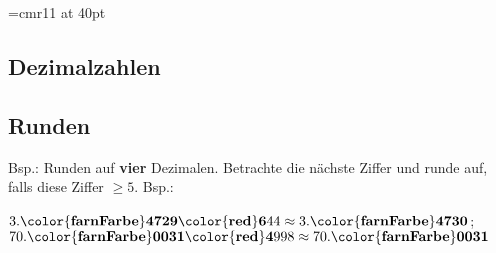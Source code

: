 \font\myfont=cmr11 at 40pt


\headerUndFooterDieseSeite{}


\arbeitsblattTitel{}%

\begin{multicols}{2}%








\section*{Dezimalzahlen}
\subsection*{Runden}
Bsp.: Runden auf \textbf{\color{farnFarbe}vier}  Dezimalen.
Betrachte die nächste Ziffer und runde auf, falls diese
{\color{red}Ziffer} $\ge 5$. Bsp.:

$3.\mathbf{\color{farnFarbe}4729}\mathbf{\color{red}6}44 \approx 3.\mathbf{\color{farnFarbe}4730}$; \hfill{ }
$70.\mathbf{\color{farnFarbe}0031}\mathbf{\color{red}4}998\approx 70.\mathbf{\color{farnFarbe}0031}$


\end{multicols}
